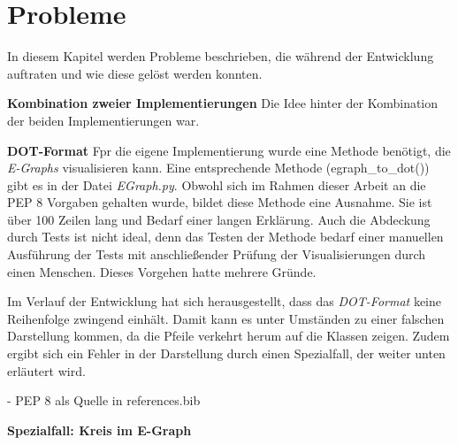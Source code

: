 \section{Probleme}\label{sec:probleme}

In diesem Kapitel werden Probleme beschrieben, die während der Entwicklung auftraten und wie diese gelöst werden konnten.

\noindent\textbf{Kombination zweier Implementierungen} Die Idee hinter der Kombination der beiden Implementierungen war.





\noindent\textbf{DOT-Format} Fpr die eigene Implementierung wurde eine Methode benötigt, die \textit{E-Graphs} visualisieren kann.
Eine entsprechende Methode (egraph\_to\_dot()) gibt es in der Datei \textit{EGraph.py}. Obwohl sich im Rahmen dieser Arbeit an die
PEP 8 Vorgaben gehalten wurde, bildet diese Methode eine Ausnahme. Sie ist über 100 Zeilen lang und Bedarf einer langen Erklärung.
Auch die Abdeckung durch Tests ist nicht ideal, denn das Testen der Methode bedarf einer manuellen Ausführung der Tests mit anschließender Prüfung der Visualisierungen
durch einen Menschen. Dieses Vorgehen hatte mehrere Gründe.

Im Verlauf der Entwicklung hat sich herausgestellt, dass das \textit{DOT-Format} keine Reihenfolge zwingend einhält. Damit kann es unter Umständen zu
einer falschen Darstellung kommen, da die Pfeile verkehrt herum auf die Klassen zeigen.
Zudem ergibt sich ein Fehler in der Darstellung durch einen Spezialfall, der weiter unten erläutert wird.



- PEP 8 als Quelle in references.bib


\noindent\textbf{Spezialfall: Kreis im E-Graph}



